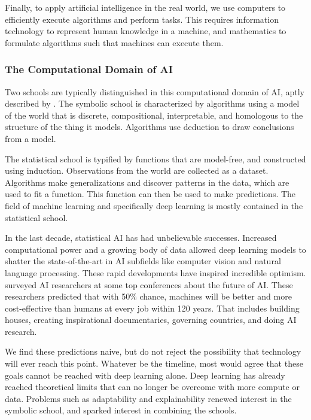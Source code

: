 Finally, to apply artificial intelligence in the real world, we use computers to efficiently execute algorithms and perform tasks. This requires information technology to represent human knowledge in a machine, and mathematics to formulate algorithms such that machines can execute them.

\subsubsection{The Computational Domain of AI}

Two schools are typically distinguished in this computational domain of AI, aptly described by \citet{van2019boxology}. The symbolic school is characterized by algorithms using a model of the world that is discrete, compositional, interpretable, and homologous to the structure of the thing it models. Algorithms use deduction to draw conclusions from a model. 

The statistical school is typified by functions that are model-free, and constructed using induction. Observations from the world are collected as a dataset. Algorithms make generalizations and discover patterns in the data, which are used to fit a function. This function can then be used to make predictions. The field of machine learning and specifically deep learning is mostly contained in the statistical school.

In the last decade, statistical AI has had unbelievable successes. Increased computational power and a growing body of data allowed deep learning models to shatter the state-of-the-art in AI subfields like computer vision and natural language processing. These rapid developments have inspired incredible optimism. \citet{grace2018will} surveyed AI researchers at some top conferences about the future of AI. These researchers predicted that with 50\% chance, machines will be better and more cost-effective than humans at every job within 120 years. That includes building houses, creating inspirational documentaries, governing countries, and doing AI research.

We find these predictions naive, but do not reject the possibility that technology will ever reach this point. Whatever be the timeline, most would agree that these goals cannot be reached with deep learning alone. Deep learning has already reached theoretical limits that can no longer be overcome with more compute or data. Problems such as adaptability and explainability renewed interest in the symbolic school, and sparked interest in combining the schools. 

